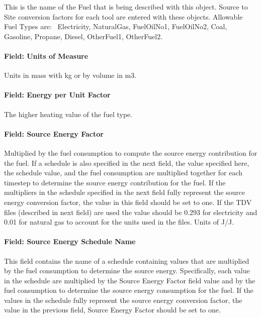 This is the name of the Fuel that is being described with this object. Source to Site conversion factors for each tool are entered with these objects. Allowable Fuel Types are:~ Electricity, NaturalGas, FuelOilNo1, FuelOilNo2, Coal, Gasoline, Propane, Diesel, OtherFuel1, OtherFuel2.

\paragraph{Field: Units of Measure}\label{field-units-of-measure}

Units in mass with kg or by volume in m3.

\paragraph{Field: Energy per Unit Factor}\label{field-energy-per-unit-factor}

The higher heating value of the fuel type.

\paragraph{Field: Source Energy Factor}\label{field-source-energy-factor}

Multiplied by the fuel consumption to compute the source energy contribution for the fuel. If a schedule is also specified in the next field, the value specified here, the schedule value, and the fuel consumption are multiplied together for each timestep to determine the source energy contribution for the fuel. If the multipliers in the schedule specified in the next field fully represent the source energy conversion factor, the value in this field should be set to one. If the TDV files (described in next field) are used the value should be 0.293 for electricity and 0.01 for natural gas to account for the units used in the files. Units of J/J.

\paragraph{Field: Source Energy Schedule Name}\label{field-source-energy-schedule-name}

This field contains the name of a schedule containing values that are multiplied by the fuel consumption to determine the source energy. Specifically, each value in the schedule are multiplied by the Source Energy Factor field value and by the fuel consumption to determine the source energy consumption for the fuel. If the values in the schedule fully represent the source energy conversion factor, the value in the previous field, Source Energy Factor should be set to one.

